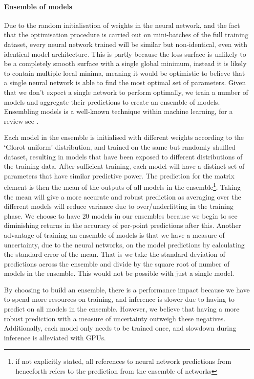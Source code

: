 \documentclass[main.tex]{subfiles}
\begin{document}
\paragraph*{Ensemble of models}
Due to the random initialisation of weights in the neural network, and the fact that the optimisation procedure is carried out on mini-batches of the full training dataset, every neural network trained will be similar but non-identical, even with identical model architecture.
This is partly because the loss surface is unlikely to be a completely smooth surface with a single global minimum, instead it is likely to contain multiple local minima, meaning it would be optimistic to believe that a single neural network is able to find the most optimal set of parameters.
Given that we don't expect a single network to perform optimally, we train a number of models and aggregate their predictions to create an ensemble of models.
Ensembling models is a well-known technique within machine learning, for a review see \cite{ZHOU2002239}.

Each model in the ensemble is initialised with different weights according to the `Glorot uniform' distribution, and trained on the same but randomly shuffled dataset, resulting in models that have been exposed to different distributions of the training data.
After sufficient training, each model will have a distinct set of parameters that have similar predictive power.
The prediction for the matrix element is then the mean of the outputs of all models in the ensemble\footnote{if not explicitly stated, all references to neural network predictions from henceforth refers to the prediction from the ensemble of networks}.
Taking the mean will give a more accurate and robust prediction as averaging over the different models will reduce variance due to over/underfitting in the training phase.
We choose to have 20 models in our ensembles because we begin to see diminishing returns in the accuracy of per-point predictions after this.
Another advantage of training an ensemble of models is that we have a measure of uncertainty, due to the neural networks, on the model predictions by calculating the standard error of the mean.
That is we take the standard deviation of predictions across the ensemble and divide by the square root of number of models in the ensemble. This would not be possible with just a single model.

By choosing to build an ensemble, there is a performance impact because we have to spend more resources on training, and inference is slower due to having to predict on all models in the ensemble.
However, we believe that having a more robust prediction with a measure of uncertainty outweigh these negatives.
Additionally, each model only needs to be trained once, and slowdown during inference is alleviated with GPUs. 
\end{document}

